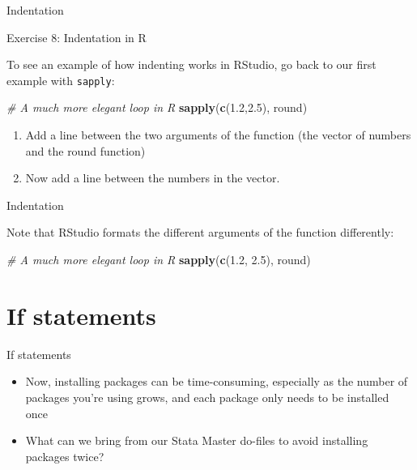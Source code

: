 \documentclass[ignorenonframetext,]{beamer}
\newenvironment{Shaded}{\begin{snugshade}}{\end{snugshade}}
\newcommand{\KeywordTok}[1]{\textcolor[rgb]{0.13,0.29,0.53}{\textbf{#1}}}
\newcommand{\FloatTok}[1]{\textcolor[rgb]{0.00,0.00,0.81}{#1}}
\newcommand{\CommentTok}[1]{\textcolor[rgb]{0.56,0.35,0.01}{\textit{#1}}}
\newcommand{\NormalTok}[1]{#1}
\providecommand{\tightlist}{%
  \setlength{\itemsep}{0pt}\setlength{\parskip}{0pt}}
\begin{document}
\begin{frame}[fragile]{Indentation}

\begin{block}{Exercise 8: Indentation in R}

To see an example of how indenting works in RStudio, go back to our
first example with \texttt{sapply}:

\begin{Shaded}
\begin{Highlighting}[]
\CommentTok{# A much more elegant loop in R}
\KeywordTok{sapply}\NormalTok{(}\KeywordTok{c}\NormalTok{(}\FloatTok{1.2}\NormalTok{,}\FloatTok{2.5}\NormalTok{), round)}
\end{Highlighting}
\end{Shaded}

\begin{enumerate}
\def\labelenumi{\arabic{enumi}.}
\item
  Add a line between the two arguments of the function (the vector of
  numbers and the round function)
\item
  Now add a line between the numbers in the vector.
\end{enumerate}

\end{block}

\end{frame}

\begin{frame}[fragile]{Indentation}

Note that RStudio formats the different arguments of the function
differently:

\begin{Shaded}
\begin{Highlighting}[]
\CommentTok{# A much more elegant loop in R}
\KeywordTok{sapply}\NormalTok{(}\KeywordTok{c}\NormalTok{(}\FloatTok{1.2}\NormalTok{,}
         \FloatTok{2.5}\NormalTok{),}
\NormalTok{       round)}
\end{Highlighting}
\end{Shaded}

\end{frame}

\section{If statements}\label{if-statements}

\begin{frame}{If statements}

\begin{itemize}
\tightlist
\item
  Now, installing packages can be time-consuming, especially as the
  number of packages you're using grows, and each package only needs to
  be installed once
\item
  What can we bring from our Stata Master do-files to avoid installing
  packages twice?
\end{itemize}

\end{frame}
\end{document}
